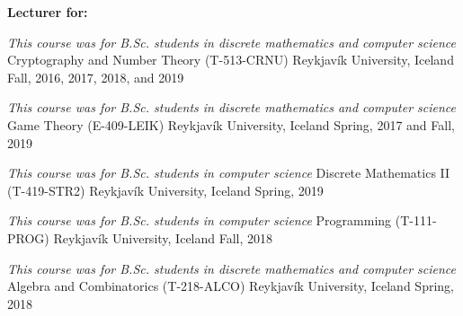


\begin{cventries}

\begin{flushleft}
\textbf{Lecturer for:}
\end{flushleft}

\cventrypresentation
  {\textit{This course was for B.Sc. students in discrete mathematics and computer science}} %
  {Cryptography and Number Theory (T-513-CRNU)} %
  {Reykjavík University, Iceland} %
  {Fall, 2016, 2017, 2018, and 2019} %


\cventrypresentation
  {\textit{This course was for B.Sc. students in discrete mathematics and computer science}} %
  {Game Theory (E-409-LEIK)} %
  {Reykjavík University, Iceland} %
  {Spring, 2017 and Fall, 2019} %


\cventrypresentation
  {\textit{This course was for B.Sc. students in computer science}} %
  {Discrete Mathematics II (T-419-STR2)} %
  {Reykjavík University, Iceland} %
  {Spring, 2019} %


\cventrypresentation
  {\textit{This course was for B.Sc. students in computer science}} %
  {Programming (T-111-PROG)} %
  {Reykjavík University, Iceland} %
  {Fall, 2018} %


\cventrypresentation
  {\textit{This course was for B.Sc. students in discrete mathematics and computer science}} %
  {Algebra and Combinatorics (T-218-ALCO)} %
  {Reykjavík University, Iceland} %
  {Spring, 2018} %


\end{cventries}
